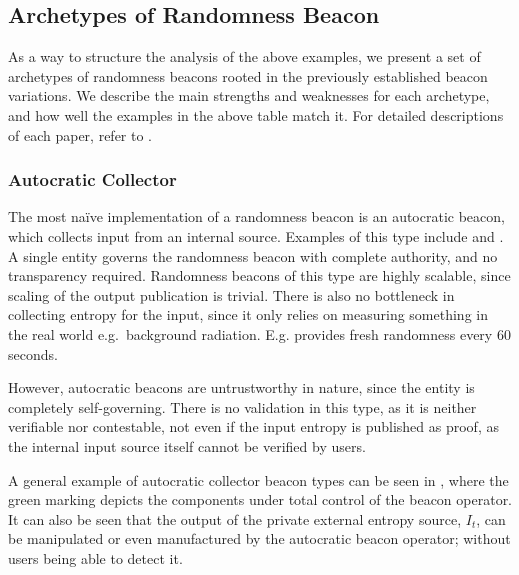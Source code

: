 \subsection{Archetypes of Randomness Beacon}
As a way to structure the analysis of the above examples, we present a set of archetypes of randomness beacons rooted in the previously established beacon variations.
We describe the main strengths and weaknesses for each archetype, and how well the examples in the above table match it. 
For detailed descriptions of each paper, refer to .
\subsubsection{Autocratic Collector}\label{ssub:autocratic}
The most naïve implementation of a randomness beacon is an autocratic beacon, which collects input from an internal source. Examples of this type include  and . 
A single entity governs the randomness beacon with complete authority, and no transparency required.
Randomness beacons of this type are highly scalable, since scaling of the output publication is trivial.
There is also no bottleneck in collecting entropy for the input, since it only relies on measuring something in the real world e.g.\ background radiation. E.g.  provides fresh randomness every 60 seconds\cite{nistbeacon}.

However, autocratic beacons are untrustworthy in nature, since the entity is completely self-governing.
There is no validation in this type, as it is neither verifiable nor contestable, not even if the input entropy is published as proof, as the internal input source itself cannot be verified by users.

A general example of autocratic collector beacon types can be seen in , where the green marking depicts the components under total control of the beacon operator.
It can also be seen that the output of the private external entropy source, $I_t$, can be manipulated or even manufactured by the autocratic beacon operator; without users being able to detect it.

